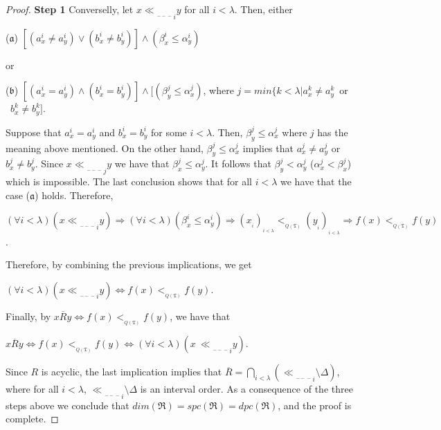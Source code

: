 \documentclass{article}
\theoremstyle{definition}
\begin{document}
\begin{proof}{\bf Step 1}
Converselly, let $x {\ll\!\!\!\!\!\!\!_{_{{-\!\!\!-\!\!\!-}}}}_{i} y$ for all $i<\lambda$. 
Then, either
\begin{center}
($\mathfrak{a}$) $[(a_{x}^{i}\neq a_{y}^{i})\vee (b_{x}^{i}\neq b_{y}^{i})]\wedge 
 (\beta_{x}^{i}\leq \alpha_{y}^{i})$
 \end{center}
or 
\begin{center}
($\mathfrak{b}$)
$[(a_{x}^{i}=a_{y}^{i})\wedge (b_{x}^{i}=b_{y}^{i})]\wedge [(\beta_{y}^{j}\leq \alpha_{x}^{j})$,
where
$j=min\{k<\lambda\vert a_{x}^{k}\neq a_{y}^{k}$\ or \  $b_{x}^{k}\neq b_{y}^{k}]$.
\end{center}
Suppose that 
$a_{x}^{i}=a_{y}^{i}$ and $b_{x}^{i}=b_{y}^{i}$
for some $i<\lambda$. Then,
$\beta_{y}^{j}\leq \alpha_{x}^{j}$ where $j$
has the meaning above mentioned. 
On the other hand, $\beta_{y}^{j}\leq \alpha_{x}^{j}$ implies that
$a_{x}^{j}\neq a_{y}^{j}$ or $b_{x}^{j}\neq b_{y}^{j}$.
Since
$x {\ll\!\!\!\!\!\!\!_{_{{-\!\!\!-\!\!\!-}}}}_{j} y$ we have that
$\beta_{x}^{j}\leq \alpha_{y}^{j}$.
It follows that $\beta_{y}^{j}< \alpha_{y}^{j}$ ($\alpha_{x}^{j}<\beta_{x}^{j}$)
which is impossible. The last conclusion shows that
for all $i<\lambda$ we have that the case ($\mathfrak{a}$) holds.
Therefore, 
\begin{center}
$(\forall i<\lambda) (x {\ll\!\!\!\!\!\!\!_{_{{-\!\!\!-\!\!\!-}}}}_{i} y)\Rightarrow (\forall i<\lambda)
(\beta_{x}^{i}\leq \alpha_{y}^{i}) \Rightarrow 
(x_{_i})_{_{i<\lambda}}<_{_{Q(\mathfrak{T})}}(y_{_i})_{_{i<\lambda}}\Rightarrow 
f(x)<_{_{Q(\mathfrak{T})}}f(y)$.
\end{center}
Therefore,
by combining the previous implications, we get 
\begin{center}
$(\forall i<\lambda) (x {\ll\!\!\!\!\!\!\!_{_{{-\!\!\!-\!\!\!-}}}}_{i} y)\Leftrightarrow 
f(x)<_{_{Q(\mathfrak{T})}}f(y)$.
\end{center}
Finally, by 
$x\overline{R}y\Leftrightarrow f(x)<_{_{Q(\mathfrak{T})}}f(y)$, we have that
\begin{center}
 $x\overline{R} y\Leftrightarrow f(x)<_{_{Q(\mathfrak{T})}}f(y)\Leftrightarrow (\forall i<\lambda) (x\
 {\ll\!\!\!\!\!\!\!_{_{{-\!\!\!-\!\!\!-}}}}_{i}y)$. 
 \end{center}
Since $R$ is acyclic, the last implication implies that
$\overline{R}=
\displaystyle\bigcap_{i<\lambda}({\ll\!\!\!\!\!\!\!_{_{{-\!\!\!-\!\!\!-}}}}_{i}\!\!\setminus \!\Delta)$,
where for all $i<\lambda$, ${\ll\!\!\!\!\!\!\!_{_{{-\!\!\!-\!\!\!-}}}}_{i}\!\!\setminus \!\Delta$ is an interval order.
As a consequence of the three steps above we conclude that
$dim(\mathfrak{R})=spc(\mathfrak{R})=dpc(\mathfrak{R})$, and the proof is complete.
\end{proof}
\end{document}
